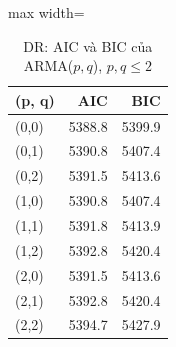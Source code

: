 \begin{table}[H]
\centering\small
\caption{DR: AIC và BIC của ARMA($p,q$), $p,q\le2$}\label{tab:tab_b11_13_dr_grid}
\begin{adjustbox}{max width=\linewidth}
\begin{tabular}{lrr}
\toprule
(p, q) & AIC & BIC \\
\midrule
(0,0) & 5388.8 & 5399.9 \\
(0,1) & 5390.8 & 5407.4 \\
(0,2) & 5391.5 & 5413.6 \\
(1,0) & 5390.8 & 5407.4 \\
(1,1) & 5391.8 & 5413.9 \\
(1,2) & 5392.8 & 5420.4 \\
(2,0) & 5391.5 & 5413.6 \\
(2,1) & 5392.8 & 5420.4 \\
(2,2) & 5394.7 & 5427.9 \\
\bottomrule
\end{tabular}
\end{adjustbox}
\end{table}
